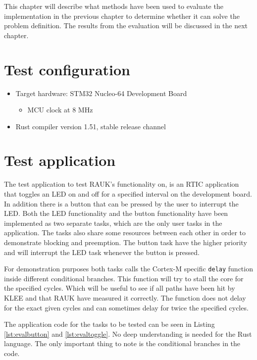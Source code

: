 This chapter will describe what methods have been used to evaluate the
implementation in the previous chapter to determine whether it can solve the
problem definition. The results from the evaluation will be discussed in
the next chapter.

\section{Test configuration}
\begin{itemize}
    \item Target hardware: STM32 Nucleo-64 Development Board
    \begin{itemize}
       \item MCU clock at 8 MHz
    \end{itemize}
    \item Rust compiler version 1.51, stable release channel
\end{itemize}

\section{Test application}
The test application to test RAUK's functionality on, is an RTIC application
that toggles an LED on and off for a specified interval on the development board. In
addition there is a button that can be pressed by the user to interrupt the
LED. Both the LED functionality and the button functionality have been
implemented as two separate tasks, which are the only user tasks in the
application. The tasks also share some resources between each other in order to
demonstrate blocking and preemption. The button task have the higher priority
and will interrupt the LED task whenever the button is pressed.

For demonstration purposes both tasks calls the Cortex-M specific
\texttt{delay} function inside different conditional branches. This function
will try to stall the core for the specified cycles. Which will be useful to
see if all paths have been hit by KLEE and that RAUK have measured it correctly.
The function does not delay for the exact given cycles and can sometimes delay
for twice the specified cycles.

The application code for the tasks to be tested can be seen in Listing
\ref{lst:evalbutton} and \ref{lst:evaltoggle}. No deep understanding is
needed for the Rust language. The only important thing to note is the
conditional branches in the code.


